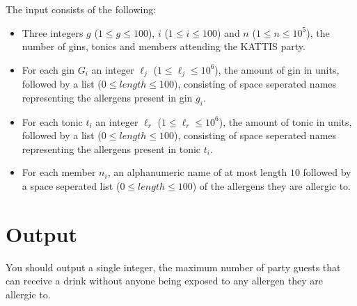 The input consists of the following:

\begin{itemize}
\item Three integers $g$ ($1 \leq g \leq 100$), $i$ ($1 \leq i \leq 100$) and $n$ ($1 \leq n \leq 10^5$), the number of gins, tonics and members attending the KATTIS party.

\item For each gin $G_i$ an integer $\ell_j$ ($1 \leq \ell_j \leq10^6$), the amount of gin in units, followed by a list ($0 \leq length \leq 100$), consisting of space seperated names representing the allergens present in gin $g_i$.

\item For each tonic $t_i$ an integer $\ell_r$ ($1 \leq \ell_r \leq 10^6$), the amount of tonic in units, followed by a list ($0 \leq length \leq 100$), consisting of space seperated names representing the allergens present in tonic $t_i$.

\item For each member $n_i$, an alphanumeric name of at most length $10$ followed by a space seperated list ($0 \leq length \leq 100$) of the allergens they are allergic to.
\end{itemize}

\section*{Output}

You should output a single integer, the maximum number of party guests that can receive a drink without anyone being exposed to any allergen they are allergic to.